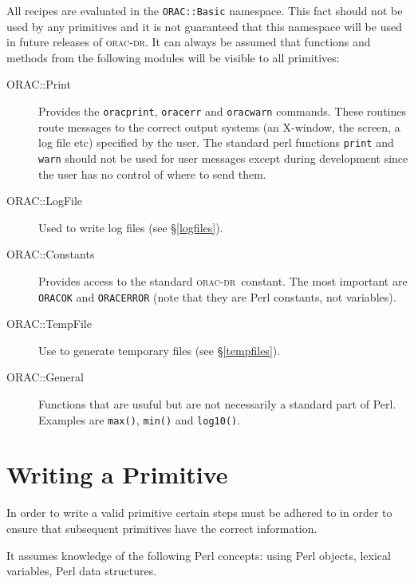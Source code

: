 \documentclass[twoside,11pt]{article}
\renewcommand{\_}{\texttt{\symbol{95}}}
\newcommand{\Oracdr}{\textsc{orac-dr}}
\begin{document}
All recipes are evaluated in the \texttt{ORAC::Basic} namespace.
This fact should not be used by any primitives and it is not
guaranteed that this namespace will be used in future releases 
of \Oracdr. It can always be assumed that functions and methods from the
following modules will be visible to all primitives:

\begin{description}
\item[ORAC::Print] \mbox{}

Provides the \texttt{orac\_print}, \texttt{orac\_err} and
\texttt{orac\_warn} commands. These routines route messages to 
the correct output systems (an X-window, the screen, a log file etc)
specified by the user. The standard perl functions \texttt{print} and
\texttt{warn} should not be used for user messages except during
development since the user has no control of where to send them.

\item[ORAC::LogFile] \mbox{}

Used to write log files (see \S\ref{logfiles}).

\item[ORAC::Constants] \mbox{}

Provides access to the standard \Oracdr\ constant. The most important
are \texttt{ORAC\_\_OK} and \texttt{ORAC\_\_ERROR} (note that they 
are Perl constants, not variables).

\item[ORAC::TempFile] \mbox{}

Use to generate temporary files (see \S\ref{tempfiles}).

\item[ORAC::General] \mbox{}

Functions that are usuful but are not necessarily a standard part of
Perl. Examples are \texttt{max()}, \texttt{min()} and \texttt{log10()}.

\end{description}


\section{Writing a Primitive}

In order to write a valid primitive certain steps must
be adhered to in order to ensure that subsequent primitives
have the correct information.

It assumes knowledge of the following Perl concepts:
using Perl objects, lexical variables, Perl data
structures. 
\end{document}
